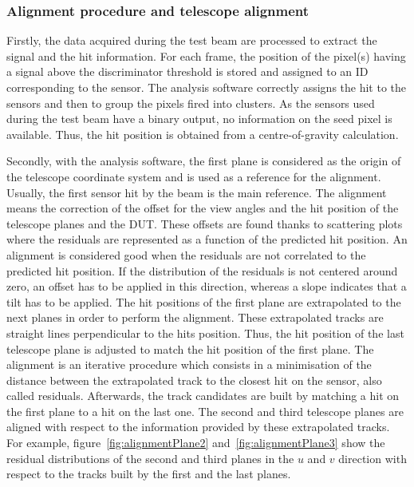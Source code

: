      \subsubsection{Alignment procedure and telescope alignment}

      Firstly, the data acquired during the test beam are processed to extract the signal and the hit information.
      For each frame, the position of the pixel(s) having a signal above the discriminator threshold is stored and assigned to an ID corresponding to the sensor.
      The analysis software correctly assigns the hit to the sensors and then to group the pixels fired into clusters.
      As the sensors used during the test beam have a binary output, no information on the seed pixel is available.
      Thus, the hit position is obtained from a centre-of-gravity calculation.

      Secondly, with the analysis software, the first plane is considered as the origin of the telescope coordinate system and is used as a reference for the alignment.
      Usually, the first sensor hit by the beam is the main reference.
      The alignment means the correction of the offset for the view angles and the hit position of the telescope planes and the \gls{DUT}.
      These offsets are found thanks to scattering plots where the residuals are represented as a function of the predicted hit position.
      An alignment is considered good when the residuals are not correlated to the predicted hit position.
      If the distribution of the residuals is not centered around zero, an offset has to be applied in this direction, whereas a slope indicates that a tilt has to be applied.
      The hit positions of the first plane are extrapolated to the next planes in order to perform the alignment.
      These extrapolated tracks are straight lines perpendicular to the hits position.
      Thus, the hit position of the last telescope plane is adjusted to match the hit position of the first plane.
      The alignment is an iterative procedure which consists in a minimisation of the distance between the extrapolated track to the closest hit on the sensor, also called residuals.
      Afterwards, the track candidates are built by matching a hit on the first plane to a hit on the last one.
      The second and third telescope planes are aligned with respect to the information provided by these extrapolated tracks.
      For example, figure~\ref{fig:alignmentPlane2} and~\ref{fig:alignmentPlane3} show the residual distributions of the second and third planes in the $u$ and $v$ direction with respect to the tracks built by the first and the last planes.

